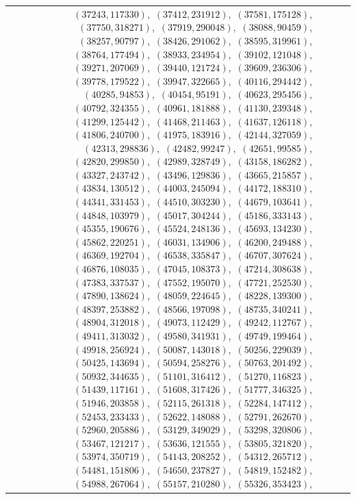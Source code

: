 \documentclass[11pt]{article}
\begin{document}
\begin{longtable}{@{}rrl>{\raggedright\arraybackslash}p{}@{}}
$(37243,117330)$,\allowbreak\ $(37412,231912)$,\allowbreak\ $(37581,175128)$,\allowbreak\ $(37750,318271)$,\allowbreak\ $(37919,290048)$,\allowbreak\ $(38088,90459)$,\allowbreak\ $(38257,90797)$,\allowbreak\ $(38426,291062)$,\allowbreak\ $(38595,319961)$,\allowbreak\ $(38764,177494)$,\allowbreak\ $(38933,234954)$,\allowbreak\ $(39102,121048)$,\allowbreak\ $(39271,207069)$,\allowbreak\ $(39440,121724)$,\allowbreak\ $(39609,236306)$,\allowbreak\ $(39778,179522)$,\allowbreak\ $(39947,322665)$,\allowbreak\ $(40116,294442)$,\allowbreak\ $(40285,94853)$,\allowbreak\ $(40454,95191)$,\allowbreak\ $(40623,295456)$,\allowbreak\ $(40792,324355)$,\allowbreak\ $(40961,181888)$,\allowbreak\ $(41130,239348)$,\allowbreak\ $(41299,125442)$,\allowbreak\ $(41468,211463)$,\allowbreak\ $(41637,126118)$,\allowbreak\ $(41806,240700)$,\allowbreak\ $(41975,183916)$,\allowbreak\ $(42144,327059)$,\allowbreak\ $(42313,298836)$,\allowbreak\ $(42482,99247)$,\allowbreak\ $(42651,99585)$,\allowbreak\ $(42820,299850)$,\allowbreak\ $(42989,328749)$,\allowbreak\ $(43158,186282)$,\allowbreak\ $(43327,243742)$,\allowbreak\ $(43496,129836)$,\allowbreak\ $(43665,215857)$,\allowbreak\ $(43834,130512)$,\allowbreak\ $(44003,245094)$,\allowbreak\ $(44172,188310)$,\allowbreak\ $(44341,331453)$,\allowbreak\ $(44510,303230)$,\allowbreak\ $(44679,103641)$,\allowbreak\ $(44848,103979)$,\allowbreak\ $(45017,304244)$,\allowbreak\ $(45186,333143)$,\allowbreak\ $(45355,190676)$,\allowbreak\ $(45524,248136)$,\allowbreak\ $(45693,134230)$,\allowbreak\ $(45862,220251)$,\allowbreak\ $(46031,134906)$,\allowbreak\ $(46200,249488)$,\allowbreak\ $(46369,192704)$,\allowbreak\ $(46538,335847)$,\allowbreak\ $(46707,307624)$,\allowbreak\ $(46876,108035)$,\allowbreak\ $(47045,108373)$,\allowbreak\ $(47214,308638)$,\allowbreak\ $(47383,337537)$,\allowbreak\ $(47552,195070)$,\allowbreak\ $(47721,252530)$,\allowbreak\ $(47890,138624)$,\allowbreak\ $(48059,224645)$,\allowbreak\ $(48228,139300)$,\allowbreak\ $(48397,253882)$,\allowbreak\ $(48566,197098)$,\allowbreak\ $(48735,340241)$,\allowbreak\ $(48904,312018)$,\allowbreak\ $(49073,112429)$,\allowbreak\ $(49242,112767)$,\allowbreak\ $(49411,313032)$,\allowbreak\ $(49580,341931)$,\allowbreak\ $(49749,199464)$,\allowbreak\ $(49918,256924)$,\allowbreak\ $(50087,143018)$,\allowbreak\ $(50256,229039)$,\allowbreak\ $(50425,143694)$,\allowbreak\ $(50594,258276)$,\allowbreak\ $(50763,201492)$,\allowbreak\ $(50932,344635)$,\allowbreak\ $(51101,316412)$,\allowbreak\ $(51270,116823)$,\allowbreak\ $(51439,117161)$,\allowbreak\ $(51608,317426)$,\allowbreak\ $(51777,346325)$,\allowbreak\ $(51946,203858)$,\allowbreak\ $(52115,261318)$,\allowbreak\ $(52284,147412)$,\allowbreak\ $(52453,233433)$,\allowbreak\ $(52622,148088)$,\allowbreak\ $(52791,262670)$,\allowbreak\ $(52960,205886)$,\allowbreak\ $(53129,349029)$,\allowbreak\ $(53298,320806)$,\allowbreak\ $(53467,121217)$,\allowbreak\ $(53636,121555)$,\allowbreak\ $(53805,321820)$,\allowbreak\ $(53974,350719)$,\allowbreak\ $(54143,208252)$,\allowbreak\ $(54312,265712)$,\allowbreak\ $(54481,151806)$,\allowbreak\ $(54650,237827)$,\allowbreak\ $(54819,152482)$,\allowbreak\ $(54988,267064)$,\allowbreak\ $(55157,210280)$,\allowbreak\ $(55326,353423)$,\allowbreak\ 
\end{longtable}
\end{document}
